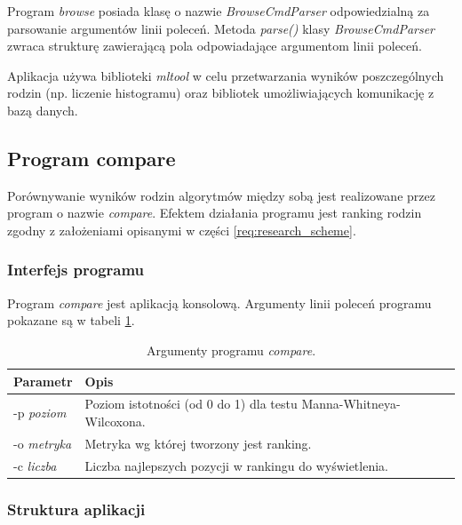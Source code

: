 \documentclass[../thesis.tex]{subfiles}
\begin{document}
Program \emph{browse} posiada klasę o nazwie \emph{BrowseCmdParser} odpowiedzialną za parsowanie argumentów linii poleceń. Metoda \emph{parse()} klasy \emph{BrowseCmdParser} zwraca strukturę zawierającą pola odpowiadające argumentom linii poleceń. 

Aplikacja używa biblioteki \emph{mltool} w celu przetwarzania wyników poszczególnych rodzin (np. liczenie histogramu) oraz bibliotek umożliwiających komunikację z bazą danych.

\subsection{Program compare}

Porównywanie wyników rodzin algorytmów między sobą jest realizowane przez program o nazwie \emph{compare}. Efektem działania programu jest ranking rodzin zgodny z założeniami opisanymi w części \ref{req:research_scheme}.

\subsubsection{Interfejs programu}

Program \emph{compare} jest aplikacją konsolową. Argumenty linii poleceń programu pokazane są w tabeli \ref{proj:table_compare_args}.

\begin{table}[h]
\begin{center}
\begin{tabular}{ | l | p{110mm} | }
\hline
\rowcolor{lightgray} Parametr & Opis \\\hline

-p \emph{poziom} & Poziom istotności (od 0 do 1) dla testu Manna-Whitneya-Wilcoxona.\\\hline
-o \emph{metryka} & Metryka wg której tworzony jest ranking.\\\hline
-c \emph{liczba} & Liczba najlepszych pozycji w rankingu do wyświetlenia.\\\hline

\end{tabular}
\caption{Argumenty programu \emph{compare}.}
\label{proj:table_compare_args}
\end{center}
\end{table}

\subsubsection{Struktura aplikacji}
\end{document}
